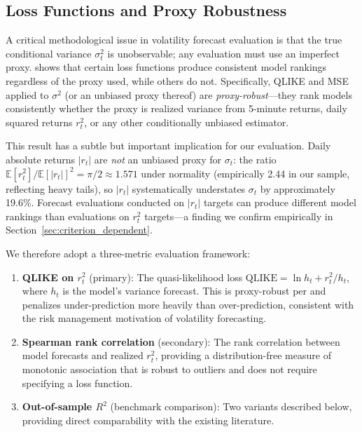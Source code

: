 \documentclass[12pt,a4paper]{article}
\begin{document}
\subsection{Loss Functions and Proxy Robustness}
\label{sec:loss_functions}

A critical methodological issue in volatility forecast evaluation is that the true conditional variance $\sigma^2_t$ is unobservable; any evaluation must use an imperfect proxy. \citet{patton2011} shows that certain loss functions produce consistent model rankings regardless of the proxy used, while others do not. Specifically, QLIKE and MSE applied to $\sigma^2$ (or an unbiased proxy thereof) are \emph{proxy-robust}---they rank models consistently whether the proxy is realized variance from 5-minute returns, daily squared returns $r_t^2$, or any other conditionally unbiased estimator.

This result has a subtle but important implication for our evaluation. Daily absolute returns $|r_t|$ are \emph{not} an unbiased proxy for $\sigma_t$: the ratio $\mathbb{E}[r_t^2]/\mathbb{E}[|r_t|]^2 = \pi/2 \approx 1.571$ under normality (empirically 2.44 in our sample, reflecting heavy tails), so $|r_t|$ systematically understates $\sigma_t$ by approximately 19.6\%. Forecast evaluations conducted on $|r_t|$ targets can produce different model rankings than evaluations on $r_t^2$ targets---a finding we confirm empirically in Section~\ref{sec:criterion_dependent}.

We therefore adopt a three-metric evaluation framework:

\begin{enumerate}
    \item \textbf{QLIKE on $r_t^2$} (primary): The quasi-likelihood loss $\text{QLIKE} = \ln h_t + r_t^2/h_t$, where $h_t$ is the model's variance forecast. This is proxy-robust per \citet{patton2011} and penalizes under-prediction more heavily than over-prediction, consistent with the risk management motivation of volatility forecasting.

    \item \textbf{Spearman rank correlation} (secondary): The rank correlation between model forecasts and realized $r_t^2$, providing a distribution-free measure of monotonic association that is robust to outliers and does not require specifying a loss function.

    \item \textbf{Out-of-sample $R^2$} (benchmark comparison): Two variants described below, providing direct comparability with the existing literature.
\end{enumerate}
\end{document}
